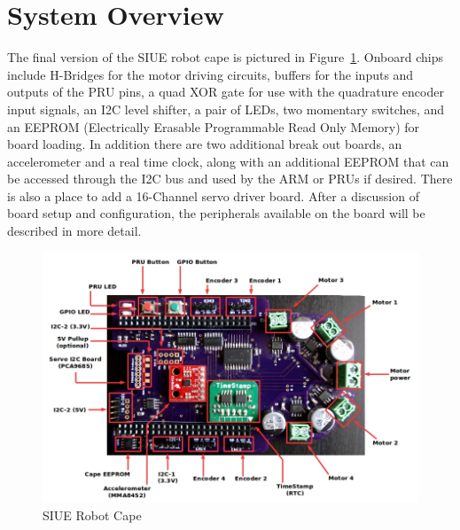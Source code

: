 \documentclass[12pt,oneside,final]{siuethesis}
\theoremstyle{definition}
\begin{document}
\section{System Overview}

The final version of the SIUE robot cape is pictured in Figure~\ref{fig:board_diagram}. Onboard chips include H-Bridges for the motor driving circuits, buffers for the inputs and outputs of the PRU pins, a quad XOR gate for use with the quadrature encoder input signals, an I2C level shifter, a pair of LEDs, two momentary switches, and an EEPROM (Electrically Erasable Programmable Read Only Memory) for board loading.  In addition there are two additional break out boards, an accelerometer and a real time clock, along with an additional EEPROM that can be accessed through the I2C bus and used by the ARM or PRUs if desired. There is also a place to add a 16-Channel servo driver board.  After a discussion of board setup and configuration, the peripherals available on the board will be described in more detail. 

%

\begin{figure}
 \centering
 \includegraphics[scale=.7,keepaspectratio=true]{./images/BoardDiagram.jpg}
 \caption{SIUE Robot Cape}
 \label{fig:board_diagram}
\end{figure}
\end{document}
